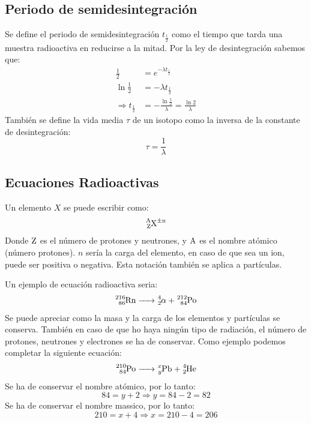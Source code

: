 \documentclass[arial,a4paper,print]{article}
\begin{document}
\subsection{Periodo de semidesintegración}
Se define el periodo de semidesintegración $t_{\frac12}$ como el tiempo que tarda una muestra radioactiva en reducirse a la mitad. Por la ley de desintegración sabemos que:
\begin{align*}
	\frac{1}{2} &= e^{-\lambda t_{\frac12}} \\
	\ln\frac12 &= -\lambda t_{\frac12}\\
	\Rightarrow t_{\frac12} &= -\frac{\ln\frac12}{\lambda} = \frac{\ln2}{\lambda}
\end{align*}
También se define la vida media $\tau$ de un isotopo como la inversa de la constante de desintegración:
\begin{equation*}
	\tau = \frac1\lambda
\end{equation*}

\subsection{Ecuaciones Radioactivas}
Un elemento $X$ se puede escribir como:
\begin{equation*}
	\ce{^A_ZX^{\pm n}}
\end{equation*}
Donde $\ce{Z}$ es el número de protones y neutrones, y $\ce{A}$ es el nombre atómico (número protones). $n$ sería la carga del elemento, en caso de que sea un ion, puede ser positiva o negativa. Esta notación también se aplica a partículas. 

Un ejemplo de ecuación radioactiva seria:
\begin{equation*}
	\ce{^216_{86}Rn -> ^4_2\alpha_ + ^212_84Po}
\end{equation*}
Se puede apreciar como la masa y la carga de los elementos y partículas se conserva. También en caso de que ho haya ningún tipo de radiación, el número de protones, neutrones y electrones se ha de conservar. Como ejemplo podemos completar la siguiente ecuación:
\begin{equation*}
	\ce{^{210}_{84}Po -> ^{x}_{y}Pb + ^{4}_{2}He}
\end{equation*}
Se ha de conservar el nombre atómico, por lo tanto:
\begin{equation*}
	84 = y + 2 \Rightarrow y = 84-2=82
\end{equation*}
Se ha de conservar el nombre massico, por lo tanto:
\begin{equation*}
	210 = x+ 4 \Rightarrow x = 210 -4=206
\end{equation*}
\end{document}
